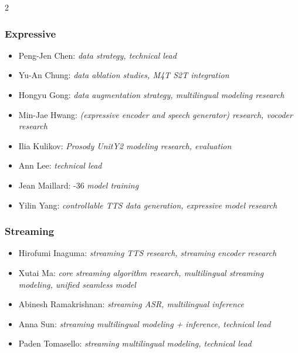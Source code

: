 \begin{multicols}{2}
\subsubsection*{Expressive}
\begin{itemize}[itemsep=0.00cm,parsep=0.0cm,left=0pt, label={}]
\item Peng-Jen Chen: \textit{data strategy, technical lead}
\item Yu-An Chung: \textit{data ablation studies, M4T S2T integration}
\item Hongyu Gong: \textit{data augmentation strategy, multilingual modeling research}
\item Min-Jae Hwang: \textit{\ptv (expressive encoder and speech generator) research, vocoder research}
\item Ilia Kulikov: \textit{Prosody UnitY2 modeling research, evaluation}
\item Ann Lee: \textit{technical lead}
\item Jean Maillard: \ptv{}-36 \textit{model training}
\item Yilin Yang: \textit{controllable TTS data generation, expressive model research}
\end{itemize}


\subsubsection*{Streaming}
\begin{itemize}[itemsep=0.00cm,parsep=0.0cm,left=0pt, label={}]
\item Hirofumi Inaguma: \textit{streaming TTS research, streaming encoder research}
\item Xutai Ma: \textit{core streaming algorithm research, multilingual streaming modeling, unified seamless model}
\item Abinesh Ramakrishnan: \textit{streaming ASR, multilingual inference }
\item Anna Sun: \textit{streaming multilingual modeling + inference, technical lead}
\item Paden Tomasello: \textit{streaming multilingual modeling,  technical lead }
\end{itemize}
\vfill
\end{multicols}

   

\newpage


